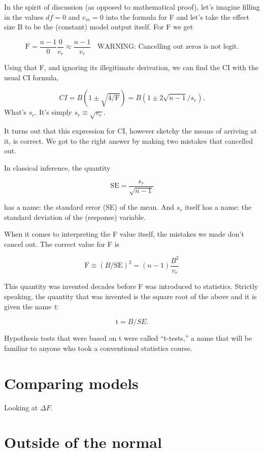 \documentclass[]{tufte-book}
\begin{document}
In the spirit of discussion (as opposed to mathematical proof), let's imagine filling in the values \(df=0\) and \(v_m=0\) into the formula for F and let's take the effect size B to be the (constant) model output itself. For F we get

\[\mbox{F}  = \frac{n - 1}{0} \frac{0}{v_r} \approx \frac{n-1}{v_r}\ \ \ \ \mbox{WARNING: Cancelling out zeros is not legit.}\]

Using that F, and ignoring its illegitimate derivation, we can find the CI with the usual CI formula,

\[CI = B (1 \pm \sqrt{4/\mbox{F}}) = B (1 \pm 2 \sqrt{n-1} / s_r).\]
What's \(s_r\). It's simply \(s_r \equiv \sqrt{v_r}\).

It turns out that this expression for CI, however sketchy the means of arriving at it, is correct. We got to the right answer by making two mistakes that cancelled out.

In classical inference, the quantity

\[\mbox{SE} = \frac{s_r}{\sqrt{n-1}}\]

has a name: the standard error (SE) of the mean. And \(s_r\) itself has a name: the standard deviation of the (response) variable.

When it comes to interpreting the F value itself, the mistakes we made don't cancel out. The correct value for F is

\[\mbox{F} \equiv (B / \mbox{SE})^2 = (n-1) \frac{B^2}{v_r}\]

This quantity was invented decades before F was introduced to statistics. Strictly speaking, the quantity that was invented is the square root of the above and it is given the name \emph{t}:

\[\mbox{t}  = B / SE.\]

Hypothesis tests that were based on t were called ``t-tests,'' a name that will be familiar to anyone who took a conventional statistics course.

\hypertarget{comparing-models}{%
\chapter{Comparing models}\label{comparing-models}}

Looking at \(\Delta F\).

\hypertarget{outside-of-the-normal}{%
\chapter{Outside of the normal}\label{outside-of-the-normal}}
\end{document}
